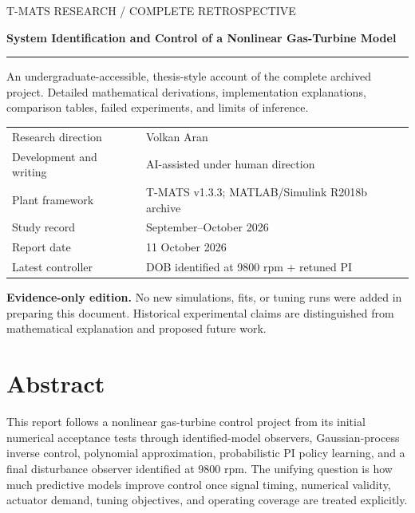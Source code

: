 \documentclass[11pt,a4paper,oneside]{report}
\begin{document}
\begin{titlepage}\sffamily\color{navy}
{\large T-MATS RESEARCH / COMPLETE RETROSPECTIVE}\par\vspace{16mm}
{\fontsize{29}{35}\selectfont\bfseries System Identification and Control of a Nonlinear Gas-Turbine Model\par}
\vspace{10mm}{\Large From numerical validation and recursive identification to inverse learning, ringing-aware policy search, and disturbance-observer control\par}
\vspace{10mm}\textcolor{teal}{\rule{\linewidth}{1.2pt}}\vspace{8mm}
\normalfont\color{black}
An undergraduate-accessible, thesis-style account of the complete archived project. Detailed mathematical derivations, implementation explanations, comparison tables, failed experiments, and limits of inference.
\vspace{10mm}
\begin{tabular}{@{}ll@{}}
Research direction & Volkan Aran\\[5pt]
Development and writing & AI-assisted under human direction\\[5pt]
Plant framework & T-MATS v1.3.3; MATLAB/Simulink R2018b archive\\[5pt]
Study record & September--October 2026\\[5pt]
Report date & 11 October 2026\\[5pt]
Latest controller & DOB identified at 9800 rpm + retuned PI
\end{tabular}
\vfill\textbf{Evidence-only edition.} No new simulations, fits, or tuning runs were added in preparing this document. Historical experimental claims are distinguished from mathematical explanation and proposed future work.
\end{titlepage}
\chapter*{Abstract}
This report follows a nonlinear gas-turbine control project from its initial numerical acceptance tests through identified-model observers, Gaussian-process inverse control, polynomial approximation, probabilistic PI policy learning, and a final disturbance observer identified at 9800 rpm. The unifying question is how much predictive models improve control once signal timing, numerical validity, actuator demand, tuning objectives, and operating coverage are treated explicitly.
\end{document}
